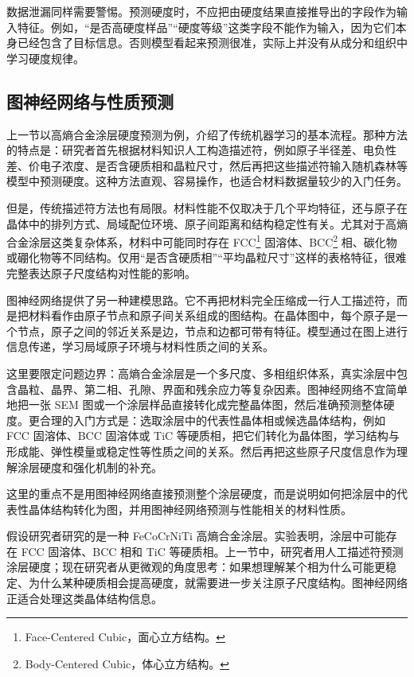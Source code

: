 数据泄漏同样需要警惕。预测硬度时，不应把由硬度结果直接推导出的字段作为输入特征。例如，“是否高硬度样品”“硬度等级”这类字段不能作为输入，因为它们本身已经包含了目标信息。否则模型看起来预测很准，实际上并没有从成分和组织中学习硬度规律。


\subsection{图神经网络与性质预测}

上一节以高熵合金涂层硬度预测为例，介绍了传统机器学习的基本流程。那种方法的特点是：研究者首先根据材料知识人工构造描述符，例如原子半径差、电负性差、价电子浓度、是否含硬质相和晶粒尺寸，然后再把这些描述符输入随机森林等模型中预测硬度。这种方法直观、容易操作，也适合材料数据量较少的入门任务。


但是，传统描述符方法也有局限。材料性能不仅取决于几个平均特征，还与原子在晶体中的排列方式、局域配位环境、原子间距离和结构稳定性有关。尤其对于高熵合金涂层这类复杂体系，材料中可能同时存在 FCC\footnote{Face-Centered Cubic，面心立方结构。} 固溶体、BCC\footnote{Body-Centered Cubic，体心立方结构。} 相、碳化物或硼化物等不同结构。仅用“是否含硬质相”“平均晶粒尺寸”这样的表格特征，很难完整表达原子尺度结构对性能的影响。


图神经网络提供了另一种建模思路。它不再把材料完全压缩成一行人工描述符，而是把材料看作由原子节点和原子间关系组成的图结构。在晶体图中，每个原子是一个节点，原子之间的邻近关系是边，节点和边都可带有特征。模型通过在图上进行信息传递，学习局域原子环境与材料性质之间的关系。


这里要限定问题边界：高熵合金涂层是一个多尺度、多相组织体系，真实涂层中包含晶粒、晶界、第二相、孔隙、界面和残余应力等复杂因素。图神经网络不宜简单地把一张 SEM 图或一个涂层样品直接转化成完整晶体图，然后准确预测整体硬度。更合理的入门方式是：选取涂层中的代表性晶体相或候选晶体结构，例如 FCC 固溶体、BCC 固溶体或 TiC 等硬质相，把它们转化为晶体图，学习结构与形成能、弹性模量或稳定性等性质之间的关系。然后再把这些原子尺度信息作为理解涂层硬度和强化机制的补充。


这里的重点不是用图神经网络直接预测整个涂层硬度，而是说明如何把涂层中的代表性晶体结构转化为图，并用图神经网络预测与性能相关的材料性质。


假设研究者研究的是一种 FeCoCrNiTi 高熵合金涂层。实验表明，涂层中可能存在 FCC 固溶体、BCC 相和 TiC 等硬质相。上一节中，研究者用人工描述符预测涂层硬度；现在研究者从更微观的角度思考：如果想理解某个相为什么可能更稳定、为什么某种硬质相会提高硬度，就需要进一步关注原子尺度结构。图神经网络正适合处理这类晶体结构信息。


